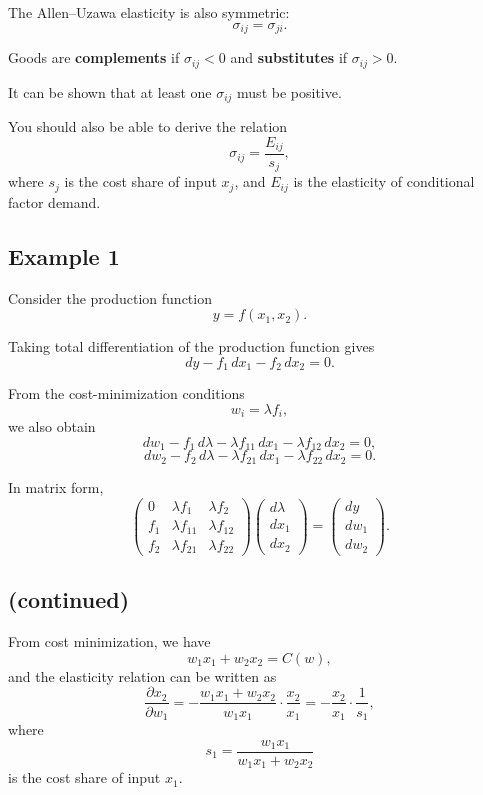 The Allen--Uzawa elasticity is also symmetric:
\[
\sigma_{ij} = \sigma_{ji}.
\]

Goods are \textbf{complements} if $\sigma_{ij}<0$ and
\textbf{substitutes} if $\sigma_{ij}>0$.

It can be shown that at least one $\sigma_{ij}$ must be positive.

You should also be able to derive the relation
\[
\sigma_{ij} = \frac{E_{ij}}{s_j},
\]
where $s_j$ is the cost share of input $x_j$, and $E_{ij}$ is the elasticity
of conditional factor demand.

\subsection*{Example 1}

Consider the production function
\[
y = f(x_1,x_2).
\]

Taking total differentiation of the production function gives
\[
dy - f_1\,dx_1 - f_2\,dx_2 = 0.
\]

From the cost-minimization conditions
\[
w_i = \lambda f_i,
\]
we also obtain
\[
dw_1 - f_1\,d\lambda - \lambda f_{11}\,dx_1 - \lambda f_{12}\,dx_2 = 0,
\]
\[
dw_2 - f_2\,d\lambda - \lambda f_{21}\,dx_1 - \lambda f_{22}\,dx_2 = 0.
\]

In matrix form,
\[
\begin{pmatrix}
0 & \lambda f_1 & \lambda f_2 \\
f_1 & \lambda f_{11} & \lambda f_{12} \\
f_2 & \lambda f_{21} & \lambda f_{22}
\end{pmatrix}
\begin{pmatrix}
d\lambda \\
dx_1 \\
dx_2
\end{pmatrix}
=
\begin{pmatrix}
dy \\
dw_1 \\
dw_2
\end{pmatrix}.
\]


\subsection*{(continued)}

From cost minimization, we have
\[
w_1 x_1 + w_2 x_2 = C(w),
\]
and the elasticity relation can be written as
\[
\frac{\partial x_2}{\partial w_1}
=
- \frac{w_1 x_1 + w_2 x_2}{w_1 x_1} \cdot \frac{x_2}{x_1}
=
- \frac{x_2}{x_1} \cdot \frac{1}{s_1},
\]
where
\[
s_1 = \frac{w_1 x_1}{w_1 x_1 + w_2 x_2}
\]
is the cost share of input $x_1$.

